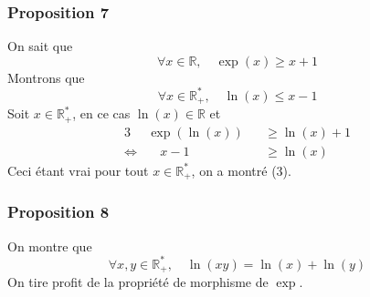 \documentclass[10pt]{article}
\def\R{\mathbb R}
\begin{document}
    \subsubsection*{Proposition 7}
    On sait que 
    \begin{equation}
        \forall x\in\R,\quad \exp(x)\geq x + 1
    \end{equation}
    Montrons que 
    \begin{equation}
        \forall x\in\R^*_+,\quad \ln(x)\leq x - 1
    \end{equation}
    Soit $x\in\R^*_+$, en ce cas $\ln(x)\in\R$ et 
    \begin{alignat*}{3}
        &\exp(\ln(x)) &&\geq \ln(x) + 1\\
        \Leftrightarrow& \quad x-1 &&\geq \ln(x)
    \end{alignat*}
    Ceci étant vrai pour tout $x\in\R^*_+$, on a montré (3).

    \subsubsection*{Proposition 8}
    On montre que 
    \begin{equation}
        \forall x,y\in\R^*_+,\quad \ln(xy)=\ln(x)+\ln(y)
    \end{equation}
    On tire profit de la propriété de morphisme de $\exp$.
\end{document}
